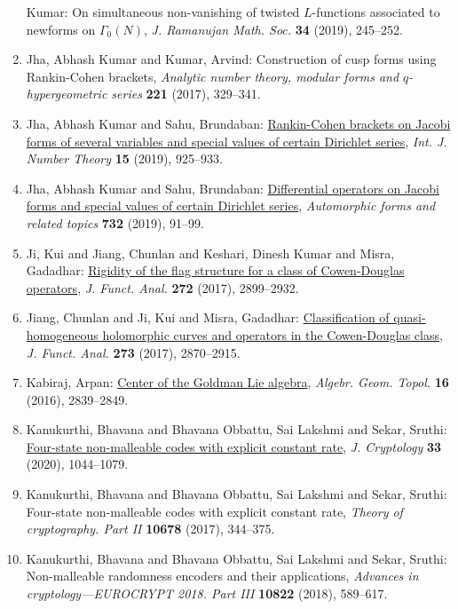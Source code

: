 \begin{enumerate}
Kumar: On simultaneous non-vanishing of twisted {$L$}-functions
associated to newforms on {$\Gamma_0(N)$}, \emph{J. Ramanujan Math. Soc.} {\bf 34} (2019), 245--252.
\item Jha, Abhash Kumar and Kumar, Arvind: Construction of cusp forms using {R}ankin-{C}ohen brackets, \emph{Analytic number theory, modular forms and {$q$}-hypergeometric
series} {\bf 221} (2017), 329--341.
\item Jha, Abhash Kumar and Sahu, Brundaban: \href{https://doi.org/10.1142/S1793042119500490}{Rankin-{C}ohen brackets on {J}acobi forms of several variables
and special values of certain {D}irichlet series}, \emph{Int. J. Number Theory} {\bf 15} (2019), 925--933.
\item Jha, Abhash Kumar and Sahu, Brundaban: \href{https://doi.org/10.1090/conm/732/14793}{Differential operators on {J}acobi forms and special values of
certain {D}irichlet series}, \emph{Automorphic forms and related topics} {\bf 732} (2019), 91--99.
\item Ji, Kui and Jiang, Chunlan and Keshari, Dinesh Kumar and
Misra, Gadadhar: \href{https://doi.org/10.1016/j.jfa.2016.12.019}{Rigidity of the flag structure for a class of
{C}owen-{D}ouglas operators}, \emph{J. Funct. Anal.} {\bf 272} (2017), 2899--2932.
\item Jiang, Chunlan and Ji, Kui and Misra, Gadadhar: \href{https://doi.org/10.1016/j.jfa.2017.06.015}{Classification of quasi-homogeneous holomorphic curves and
operators in the {C}owen-{D}ouglas class}, \emph{J. Funct. Anal.} {\bf 273} (2017), 2870--2915.
\item Kabiraj, Arpan: \href{https://doi.org/10.2140/agt.2016.16.2839}{Center of the {G}oldman {L}ie algebra}, \emph{Algebr. Geom. Topol.} {\bf 16} (2016), 2839--2849.
\item Kanukurthi, Bhavana and Bhavana Obbattu, Sai Lakshmi and
Sekar, Sruthi: \href{https://doi.org/10.1007/s00145-019-09339-7}{Four-state non-malleable codes with explicit constant rate}, \emph{J. Cryptology} {\bf 33} (2020), 1044--1079.
\item Kanukurthi, Bhavana and Bhavana Obbattu, Sai Lakshmi and
Sekar, Sruthi: Four-state non-malleable codes with explicit constant rate, \emph{Theory of cryptography. {P}art {II}} {\bf 10678} (2017), 344--375.
\item Kanukurthi, Bhavana and Bhavana Obbattu, Sai Lakshmi and
Sekar, Sruthi: Non-malleable randomness encoders and their applications, \emph{Advances in cryptology---{EUROCRYPT} 2018. {P}art {III}} {\bf 10822} (2018), 589--617.

\end{enumerate}
